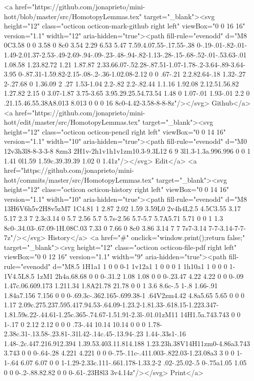 {      <a href="https://github.com/jonaprieto/mini-hott/blob/master/src/HomotopyLemmas.tex" target="_blank"><svg height="12" class="octicon octicon-mark-github right left" viewBox="0 0 16 16" version="1.1" width="12" aria-hidden="true"><path fill-rule="evenodd" d="M8 0C3.58 0 0 3.58 0 8c0 3.54 2.29 6.53 5.47 7.59.4.07.55-.17.55-.38 0-.19-.01-.82-.01-1.49-2.01.37-2.53-.49-2.69-.94-.09-.23-.48-.94-.82-1.13-.28-.15-.68-.52-.01-.53.63-.01 1.08.58 1.23.82.72 1.21 1.87.87 2.33.66.07-.52.28-.87.51-1.07-1.78-.2-3.64-.89-3.64-3.95 0-.87.31-1.59.82-2.15-.08-.2-.36-1.02.08-2.12 0 0 .67-.21 2.2.82.64-.18 1.32-.27 2-.27.68 0 1.36.09 2 .27 1.53-1.04 2.2-.82 2.2-.82.44 1.1.16 1.92.08 2.12.51.56.82 1.27.82 2.15 0 3.07-1.87 3.75-3.65 3.95.29.25.54.73.54 1.48 0 1.07-.01 1.93-.01 2.2 0 .21.15.46.55.38A8.013 8.013 0 0 0 16 8c0-4.42-3.58-8-8-8z"/></svg> Github</a>
      <a href="https://github.com/jonaprieto/mini-hott/edit/master/src/HomotopyLemmas.tex" target="_blank"><svg height="12" class="octicon octicon-pencil right left" viewBox="0 0 14 16" version="1.1" width="10" aria-hidden="true"><path fill-rule="evenodd" d="M0 12v3h3l8-8-3-3-8 8zm3 2H1v-2h1v1h1v1zm10.3-9.3L12 6 9 3l1.3-1.3a.996.996 0 0 1 1.41 0l1.59 1.59c.39.39.39 1.02 0 1.41z"/></svg> Edit</a>
      <a href="https://github.com/jonaprieto/mini-hott/commits/master/src/HomotopyLemmas.tex" target="_blank"><svg height="12" class="octicon octicon-history right left" viewBox="0 0 14 16" version="1.1" width="10" aria-hidden="true"><path fill-rule="evenodd" d="M8 13H6V6h5v2H8v5zM7 1C4.81 1 2.87 2.02 1.59 3.59L0 2v4h4L2.5 4.5C3.55 3.17 5.17 2.3 7 2.3c3.14 0 5.7 2.56 5.7 5.7s-2.56 5.7-5.7 5.7A5.71 5.71 0 0 1 1.3 8c0-.34.03-.67.09-1H.08C.03 7.33 0 7.66 0 8c0 3.86 3.14 7 7 7s7-3.14 7-7-3.14-7-7-7z"/></svg> History</a>
      <a  href="#" onclick="window.print();return false;" target="_blank"><svg height="12" class="octicon octicon-file-pdf right left" viewBox="0 0 12 16" version="1.1" width="9" aria-hidden="true"><path fill-rule="evenodd" d="M8.5 1H1a1 1 0 0 0-1 1v12a1 1 0 0 0 1 1h10a1 1 0 0 0 1-1V4.5L8.5 1zM1 2h4a.68.68 0 0 0-.31.2 1.08 1.08 0 0 0-.23.47 4.22 4.22 0 0 0-.09 1.47c.06.609.173 1.211.34 1.8A21.78 21.78 0 0 1 3.6 8.6c-.5 1-.8 1.66-.91 1.84a7.156 7.156 0 0 0-.69.3c-.362.165-.699.38-1 .64V2zm4.42 4.8a5.65 5.65 0 0 0 1.17 2.09c.275.237.595.417.94.53-.64.09-1.23.2-1.81.33-.618.15-1.223.347-1.81.59s.22-.44.61-1.25c.365-.74.67-1.51.91-2.3l-.01.01zM11 14H1.5a.743.743 0 0 1-.17 0 2.12 2.12 0 0 0 .73-.44 10.14 10.14 0 0 0 1.78-2.38c.31-.13.58-.23.81-.31l.42-.14c.45-.13.94-.23 1.44-.33s1-.16 1.48-.2c.447.216.912.394 1.39.53.403.11.814.188 1.23.23h.38V14H11zm0-4.86a3.743 3.743 0 0 0-.64-.28 4.221 4.221 0 0 0-.75-.11c-.411.003-.822.03-1.23.08a3 3 0 0 1-1-.64 6.07 6.07 0 0 1-1.29-2.33c.111-.661.178-1.33.2-2 .02-.25.02-.5 0-.75a1.05 1.05 0 0 0-.2-.88.82.82 0 0 0-.61-.23H8l3 3v4.14z"/></svg> Print</a>
}
